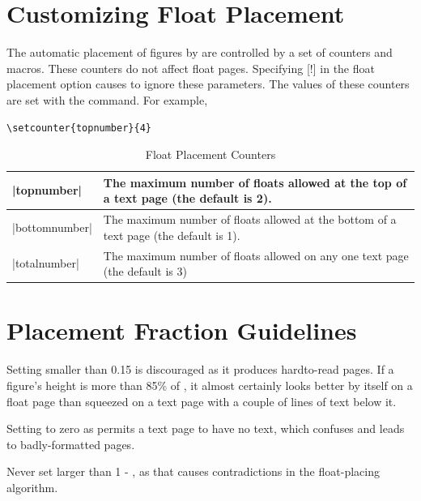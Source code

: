 \section{Customizing Float Placement}

The automatic placement of figures by \latexe are controlled by a set of counters and macros. These counters do not affect float pages. Specifying [!] in the float placement option causes \latex to ignore these parameters. The values of these counters are set with the  command. For example,

\begin{verbatim}
\setcounter{topnumber}{4}
\end{verbatim}

\begin{table}[htbp]
\caption{Float Placement Counters}
\centering
\begin{tabularx}{0.8\textwidth}{|l|X|}
\hline
|topnumber| & The maximum number of floats allowed at the top of a text page (the default is 2).\\
\hline
|bottomnumber| &The maximum number of floats allowed at the bottom of a text
page (the default is 1).\\
\hline
|totalnumber| &The maximum number of floats allowed on any one text page
(the default is 3)\\
\hline
\end{tabularx}
\end{table}

\reversemarginpar

\section{Placement Fraction Guidelines}

\begin{macro}{\textfaction}
    Setting \textfraction smaller than 0.15 is discouraged as it produces hardto-read
    pages. If a figure’s height is more than 85\% of \cmd{\textheight}, it almost
    certainly looks better by itself on a float page than squeezed on a text page
    with a couple of lines of text below it.
    
    Setting \cmd{\textfraction} to zero as permits a text page to have
   no text, which confuses \latex and leads to badly-formatted pages.
\end{macro}
%
\begin{macro}{\topfraction}
Never set \cmd{\topfraction} larger than 1 - \cmd{\textfraction}, as that causes contradictions
in the float-placing algorithm.
\end{macro}

